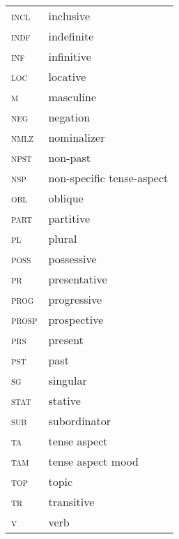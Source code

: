 ﻿\documentclass[output=paper]{langsci/langscibook}
\begin{document}
\begin{minipage}{\textwidth}
\begin{tabularx}{.5\textwidth}[t]{ l Q @{}}
\textsc{incl}  &inclusive\\
\textsc{indf}	    &indefinite\\
\textsc{inf}        &infinitive\\
\textsc{loc}		&locative\\
\textsc{m} 		&masculine\\
\textsc{neg}		&negation\\
\textsc{nmlz}       &nominalizer\\
\textsc{npst}       &non-past\\
\textsc{nsp}        &non-specific tense-aspect\\
\textsc{obl}		&oblique\\
\textsc{part}		&partitive\\
\textsc{pl}		&plural\\
\textsc{poss}		&possessive\\
\textsc{pr}		&presentative\\
\textsc{prog}		&progressive\\
\textsc{prosp}		&prospective\\
\textsc{prs}		&present\\
\textsc{pst}	&past\\
\textsc{sg}		&singular\\
\textsc{stat}		&stative\\
\textsc{sub}		&subordinator\\
\textsc{ta}		&tense aspect\\
\textsc{tam}		&tense aspect mood\\
\textsc{top}		&topic\\
\textsc{tr}         &transitive\\
\textsc{v}          &verb\\
\end{tabularx}
\end{minipage}
\end{document}
